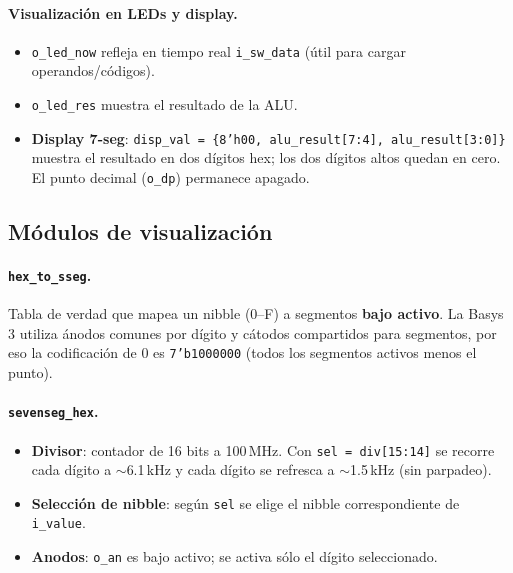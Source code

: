 \paragraph{Visualización en LEDs y display.}
\begin{itemize}
    \item \texttt{o\_led\_now} refleja en tiempo real \texttt{i\_sw\_data} (útil para cargar operandos/códigos).
    \item \texttt{o\_led\_res} muestra el resultado de la ALU.
    \item \textbf{Display 7-seg}: \texttt{disp\_val = \{8'h00, alu\_result[7:4], alu\_result[3:0]\}} muestra el resultado en dos dígitos hex; los dos dígitos altos quedan en cero. El punto decimal (\texttt{o\_dp}) permanece apagado.
\end{itemize}

\subsection{Módulos de visualización}
\paragraph{\texttt{hex\_to\_sseg}.}
Tabla de verdad que mapea un nibble (0--F) a segmentos \textbf{bajo activo}. La Basys 3 utiliza ánodos comunes por dígito y cátodos compartidos para segmentos, por eso la codificación de 0 es \texttt{7'b1000000} (todos los segmentos activos menos el punto).

\paragraph{\texttt{sevenseg\_hex}.}
\begin{itemize}
    \item \textbf{Divisor}: contador de 16 bits a 100\,MHz. Con \texttt{sel = div[15:14]} se recorre cada dígito a $\sim$6.1\,kHz y cada dígito se refresca a $\sim$1.5\,kHz (sin parpadeo).
    \item \textbf{Selección de nibble}: según \texttt{sel} se elige el nibble correspondiente de \texttt{i\_value}.
    \item \textbf{Anodos}: \texttt{o\_an} es bajo activo; se activa sólo el dígito seleccionado.
\end{itemize}

